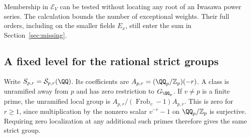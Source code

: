 \documentclass[a4paper,11pt]{article}
\theoremstyle{definition}
\theoremstyle{remark}
\newcommand{\ZZ}{\mathbb Z}\newcommand{\ord}{\operatorname{ord}}
\numberwithin{equation}{section}
\begin{document}
Membership in \(\mathcal E_V\) can be tested without locating
any root of an Iwasawa power series. The calculation bounds the
number of exceptional weights. Their full orders, including on the
smaller fields \(E_x\), still enter the sum in Section~\ref{sec:missing}.


\subsection{A fixed level for the rational strict groups}
\label{sec:rationalfixed538}

Write \(S_{p,r}=\mathcal S_{p,r}(\QQ)\). Its coefficients are
\(A_{p,r}=(\QQ_p/\ZZ_p)(-r)\). A class is unramified away
from \(p\) and has zero restriction to \(G_{\QQ_p}\).
If \(v\ne p\) is a finite prime, the unramified local group is
\(A_{p,r}/(\operatorname{Frob}_v-1)A_{p,r}\). This is zero for
\(r\ge1\), since multiplication by the nonzero scalar
\(v^{-r}-1\) on \(\QQ_p/\ZZ_p\) is surjective. Requiring zero
localization at any additional such primes therefore gives
the same strict group.
\end{document}
